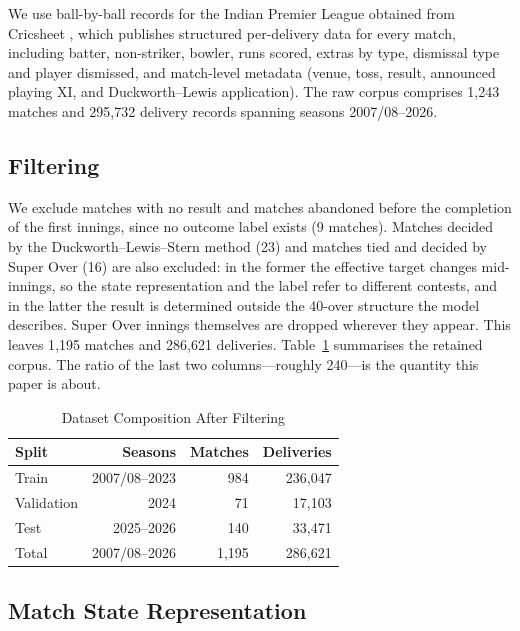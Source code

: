 \documentclass[conference]{IEEEtran}
\begin{document}
We use ball-by-ball records for the Indian Premier League obtained from
Cricsheet \cite{cricsheet}, which publishes structured per-delivery data
for every match, including batter, non-striker, bowler, runs scored,
extras by type, dismissal type and player dismissed, and match-level
metadata (venue, toss, result, announced playing XI, and
Duckworth--Lewis application). The raw corpus comprises 1{,}243 matches
and 295{,}732 delivery records spanning seasons 2007/08--2026.

\subsection{Filtering}

We exclude matches with no result and matches abandoned before the
completion of the first innings, since no outcome label exists (9
matches). Matches decided by the Duckworth--Lewis--Stern method (23) and
matches tied and decided by Super Over (16) are also excluded: in the
former the effective target changes mid-innings, so the state
representation and the label refer to different contests, and in the
latter the result is determined outside the 40-over structure the model
describes. Super Over innings themselves are dropped wherever they
appear. This leaves 1{,}195 matches and 286{,}621 deliveries.
Table~\ref{tab:data} summarises the retained corpus. The ratio of the
last two columns---roughly 240---is the quantity this paper is about.

\begin{table}[htbp]
\caption{Dataset Composition After Filtering}
\label{tab:data}
\centering
\begin{tabular}{lrrr}
\toprule
\textbf{Split} & \textbf{Seasons} & \textbf{Matches} & \textbf{Deliveries} \\
\midrule
Train      & 2007/08--2023 & 984 & 236{,}047 \\
Validation & 2024          & 71  & 17{,}103 \\
Test       & 2025--2026    & 140 & 33{,}471 \\
\midrule
Total      & 2007/08--2026 & 1{,}195 & 286{,}621 \\
\bottomrule
\end{tabular}
\end{table}

\subsection{Match State Representation}
\end{document}
